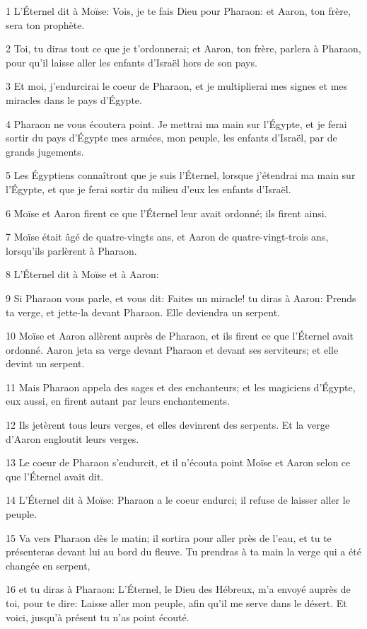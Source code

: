 \par 1 L'Éternel dit à Moïse: Vois, je te fais Dieu pour Pharaon: et Aaron, ton frère, sera ton prophète.
\par 2 Toi, tu diras tout ce que je t'ordonnerai; et Aaron, ton frère, parlera à Pharaon, pour qu'il laisse aller les enfants d'Israël hors de son pays.
\par 3 Et moi, j'endurcirai le coeur de Pharaon, et je multiplierai mes signes et mes miracles dans le pays d'Égypte.
\par 4 Pharaon ne vous écoutera point. Je mettrai ma main sur l'Égypte, et je ferai sortir du pays d'Égypte mes armées, mon peuple, les enfants d'Israël, par de grands jugements.
\par 5 Les Égyptiens connaîtront que je suis l'Éternel, lorsque j'étendrai ma main sur l'Égypte, et que je ferai sortir du milieu d'eux les enfants d'Israël.
\par 6 Moïse et Aaron firent ce que l'Éternel leur avait ordonné; ils firent ainsi.
\par 7 Moïse était âgé de quatre-vingts ans, et Aaron de quatre-vingt-trois ans, lorsqu'ils parlèrent à Pharaon.
\par 8 L'Éternel dit à Moïse et à Aaron:
\par 9 Si Pharaon vous parle, et vous dit: Faites un miracle! tu diras à Aaron: Prends ta verge, et jette-la devant Pharaon. Elle deviendra un serpent.
\par 10 Moïse et Aaron allèrent auprès de Pharaon, et ils firent ce que l'Éternel avait ordonné. Aaron jeta sa verge devant Pharaon et devant ses serviteurs; et elle devint un serpent.
\par 11 Mais Pharaon appela des sages et des enchanteurs; et les magiciens d'Égypte, eux aussi, en firent autant par leurs enchantements.
\par 12 Ils jetèrent tous leurs verges, et elles devinrent des serpents. Et la verge d'Aaron engloutit leurs verges.
\par 13 Le coeur de Pharaon s'endurcit, et il n'écouta point Moïse et Aaron selon ce que l'Éternel avait dit.
\par 14 L'Éternel dit à Moïse: Pharaon a le coeur endurci; il refuse de laisser aller le peuple.
\par 15 Va vers Pharaon dès le matin; il sortira pour aller près de l'eau, et tu te présenteras devant lui au bord du fleuve. Tu prendras à ta main la verge qui a été changée en serpent,
\par 16 et tu diras à Pharaon: L'Éternel, le Dieu des Hébreux, m'a envoyé auprès de toi, pour te dire: Laisse aller mon peuple, afin qu'il me serve dans le désert. Et voici, jusqu'à présent tu n'as point écouté.
